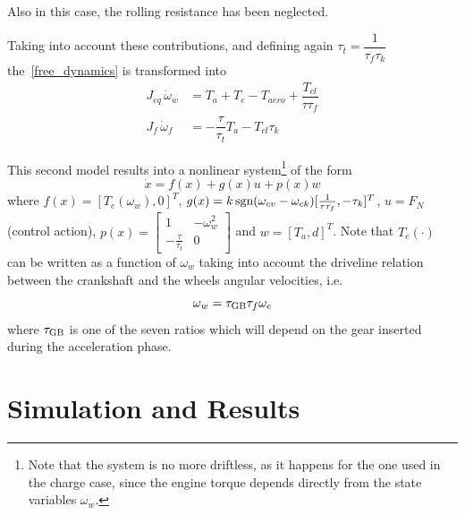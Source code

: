 \documentclass[11pt]{article}
\begin{document}
Also in this case, the rolling resistance has been neglected.

Taking into account these contributions, and defining again $\tau_{t} = \dfrac{1}{\tau_f \tau_k}$ the~\eqref{free_dynamics} is transformed into 
\begin{equation}
\begin{split}
J_{eq}\, \dot{\omega}_w & = T_a + T_e - T_{aero} + \dfrac{T_{cl}}{\tau \tau_f}  \\
J_f\, \dot{\omega}_f & = -\dfrac{\tau}{\tau_{t}} T_a - T_{cl} \tau_k
\end{split}
\label{kers_full_dynamics_discharge}
\end{equation}

This second model results into a nonlinear system\footnote{Note that the system is no more driftless, as it happens for the one used in the charge case, since the engine torque depends directly from the state variables $\omega_w$.} of the form
\[
\dot{x} = f(x) + g(x)u + p(x)w 
\]
where $f(x) = [T_e(\omega_w), 0]^T$, $g(x) = k \, \textup{sgn} (\omega_{cv} - \omega_{ck}) [\frac{1}{\tau \tau_f} , -\tau_k]^T$, $u = F_N$ (control action), $p(x) =\left[  \begin{smallmatrix}
1 & -\omega_w^2 \\
-\frac{\tau}{\tau_t} & 0
\end{smallmatrix}\right] $
and $w = [T_a, d]^T$. Note that $T_e(\cdot)$ can be written as a function of $\omega_w$ taking into account the driveline relation between the crankshaft and the wheels angular velocities, i.e.
\begin{equation}
\omega_w = \tau_{\textup{GB}} \tau_f \omega_e
\label{driveline_relation}
\end{equation}
where $\tau_{\textup{GB}}$ is one of the seven ratios which will depend on the gear inserted during the acceleration phase.

\section{Simulation and Results}

\end{document}
